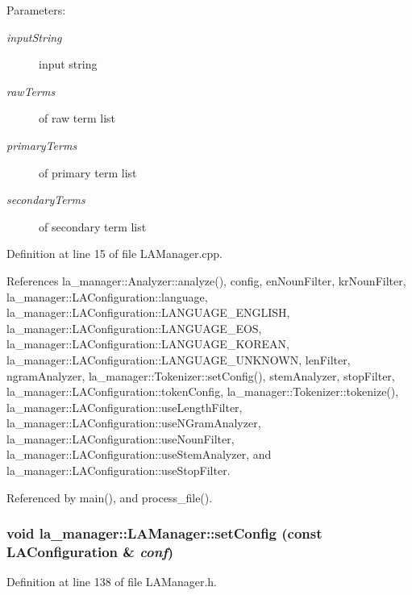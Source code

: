 \begin{Desc}
\item[Parameters:]
\begin{description}
\item[{\em inputString}]input string \item[{\em rawTerms}]of raw term list \item[{\em primaryTerms}]of primary term list \item[{\em secondaryTerms}]of secondary term list \end{description}
\end{Desc}


Definition at line 15 of file LAManager.cpp.

References la\_\-manager::Analyzer::analyze(), config, enNounFilter, krNounFilter, la\_\-manager::LAConfiguration::language, la\_\-manager::LAConfiguration::LANGUAGE\_\-ENGLISH, la\_\-manager::LAConfiguration::LANGUAGE\_\-EOS, la\_\-manager::LAConfiguration::LANGUAGE\_\-KOREAN, la\_\-manager::LAConfiguration::LANGUAGE\_\-UNKNOWN, lenFilter, ngramAnalyzer, la\_\-manager::Tokenizer::setConfig(), stemAnalyzer, stopFilter, la\_\-manager::LAConfiguration::tokenConfig, la\_\-manager::Tokenizer::tokenize(), la\_\-manager::LAConfiguration::useLengthFilter, la\_\-manager::LAConfiguration::useNGramAnalyzer, la\_\-manager::LAConfiguration::useNounFilter, la\_\-manager::LAConfiguration::useStemAnalyzer, and la\_\-manager::LAConfiguration::useStopFilter.

Referenced by main(), and process\_\-file().\hypertarget{classla__manager_1_1LAManager_2904779650c22fe381b436ab2d23e13a}{
\subsubsection[{setConfig}]{\setlength{\rightskip}{0pt plus 5cm}void la\_\-manager::LAManager::setConfig (const {\bf LAConfiguration} \& {\em conf})}}
\label{classla__manager_1_1LAManager_2904779650c22fe381b436ab2d23e13a}




Definition at line 138 of file LAManager.h.


